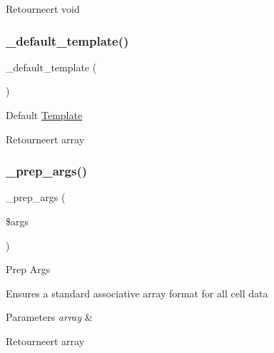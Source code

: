 \begin{DoxyReturn}{Retourneert}
void 
\end{DoxyReturn}
\mbox{\label{class_c_i___table_ae1990fcb9ffc455614eeac9a1091f0b0}} 
\subsubsection{\texorpdfstring{\_default\_template()}{\_default\_template()}}
{\footnotesize\ttfamily \+\_\+default\+\_\+template (\begin{DoxyParamCaption}{ }\end{DoxyParamCaption})\hspace{0.3cm}{\ttfamily [protected]}}

Default \mbox{\hyperlink{class_template}{Template}}

\begin{DoxyReturn}{Retourneert}
array 
\end{DoxyReturn}
\mbox{\label{class_c_i___table_aec91c20b757a8a063e4147f0aebe8b1b}} 
\subsubsection{\texorpdfstring{\_prep\_args()}{\_prep\_args()}}
{\footnotesize\ttfamily \+\_\+prep\+\_\+args (\begin{DoxyParamCaption}\item[{}]{\$args }\end{DoxyParamCaption})\hspace{0.3cm}{\ttfamily [protected]}}

Prep Args

Ensures a standard associative array format for all cell data


\begin{DoxyParams}{Parameters}
{\em array} & \\
\hline
\end{DoxyParams}
\begin{DoxyReturn}{Retourneert}
array 
\end{DoxyReturn}
\mbox{\label{class_c_i___table_a79c6ca8fd1f4e5b4bee157209e866a02}} 
